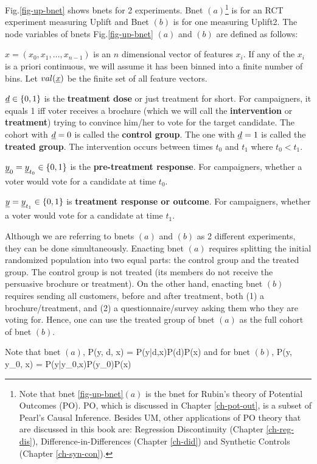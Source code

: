 Fig.\ref{fig-up-bnet} shows bnets for 2 experiments. Bnet $(a)$\footnote{
Note that bnet \ref{fig-up-bnet}$(a)$ 
is the bnet for Rubin's theory of 
Potential Outcomes (PO).
PO, which is
discussed in Chapter \ref{ch-pot-out},
 is a subset
of Pearl's Causal Inference.
Besides UM, other  applications of PO theory
that are discussed in this book 
are: Regression Discontinuity (Chapter \ref{ch-reg-dis}),
Difference-in-Differences (Chapter \ref{ch-did})
and Synthetic Controls (Chapter \ref{ch-syn-con}).} is for an RCT experiment measuring 
Uplift and Bnet $(b)$ is for one measuring Uplift2. 
The node variables of bnets Fig.\ref{fig-up-bnet}
$(a)$ and $(b)$
are defined as follows:

$x=(x_0, x_1,\dots, x_{n-1})$ is an $n$ dimensional 
vector of features $x_i$. If any of the $x_i$
is a priori continuous, we will
assume it has  been binned into
a finite number of bins.
Let $val(\rvx)$ be the finite set of  all feature vectors.

$\rvd\in\bool$ is the {\bf treatment dose} or just treatment for short. For campaigners, it equals 1 iff voter receives
a brochure (which
we will call the {\bf intervention}
or {\bf treatment}) trying to convince him/her to vote 
for the target  candidate. The cohort with $\rvd=0$ is called the {\bf control group}. The one with $\rvd=1$ is called the {\bf treated group}.
The intervention occurs between times $t_0$ and $t_1$
where $t_0<t_1$.

$\rvy_0=\rvy_{t_0}\in \bool$ is the 
{\bf pre-treatment response}. For campaigners, whether a voter would
vote for a candidate at time $t_0$.

$\rvy=\rvy_{t_1}\in \bool$
is {\bf treatment response or outcome}. For campaigners, whether a voter would
vote for a candidate at time $t_1$. 

Although we are referring to bnets $(a)$
and $(b)$ as 2 different experiments, they can be done
simultaneously. Enacting
bnet $(a)$ requires splitting the initial 
randomized population into two equal parts:
the control group and the treated group.
The control group is not treated (its members do
not receive the persuasive brochure or treatment). On the other hand, enacting bnet $(b)$ requires
sending all customers, before and after treatment, both (1) a brochure/treatment,
and  (2) a questionnaire/survey asking them who they are voting for.
Hence, one can use the treated group of
bnet $(a)$ as the full cohort of bnet $(b)$.

Note that bnet $(a)$, 
\beq
P(y, d, x) = P(y|d,x)P(d)P(x)
\eeq
and for bnet $(b)$,
\beq
P(y, y_0, x) = P(y|y_0,x)P(y_0)P(x)
\eeq

